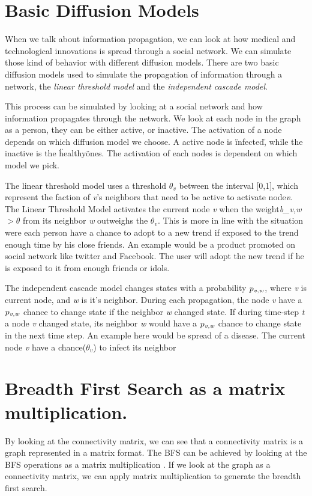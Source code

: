\section{Basic Diffusion Models}
When we talk about information propagation, we can look at how medical and technological innovations is spread through a social network. We can simulate those kind of behavior with different diffusion models. There are two basic diffusion models used to simulate the propagation of information through a network\cite{MaximizeSpread2003}, the {\it linear threshold model} and the {\it independent cascade model}\cite{MaximizeSpread2003}.

This process can be simulated by looking at a social network and how information propagates through the network. We look at each node in the graph as a person, they can be either active, or inactive. The activation of a node depends on which diffusion model we choose. A active node is \"infected\", while the inactive is the \"healthy\" ones. The activation of each nodes is dependent on which model we pick.

The linear threshold model uses a threshold $\theta_v$ between the interval [0,1], which represent the faction of {\it v}'s neighbors that need to be active to activate node{\it v}. The Linear Threshold Model activates the current node {\it v} when the weight{\it b_{v,w}} $> \theta$ from its neighbor {\it w} outweighs the $\theta_v$. This is more in line with the situation were each person have a chance to adopt to a new trend if exposed to the trend enough time by his close friends. An example would be a product promoted on social network like twitter and Facebook. The user will adopt the new trend if he is exposed to it from enough friends or idols. 

The independent cascade model changes states with a probability $p_{\it v, w}$, where {\it v }is current node, and {\it w} is it's neighbor. During each propagation, the node {\it v} have a  $p_{\it v, w}$ chance to change state if the neighbor {\it w} changed state. If during time-step {\it t} a node {\it v} changed state, its neighbor {\it w} would have a  $p_{\it v, w}$ chance to change state in the next time step. An example here would be spread of a disease. The current node {\it v} have a chance($\theta_v$) to infect its neighbor

\section{Breadth First Search as a matrix multiplication.}
By looking at the 	connectivity matrix, we can see that a connectivity matrix is a graph represented in a matrix format. The BFS can be achieved by looking at the BFS operations as a matrix multiplication \cite{algoToMath}. If we look at the graph as a connectivity matrix, we can apply matrix multiplication to generate the breadth first search. 

